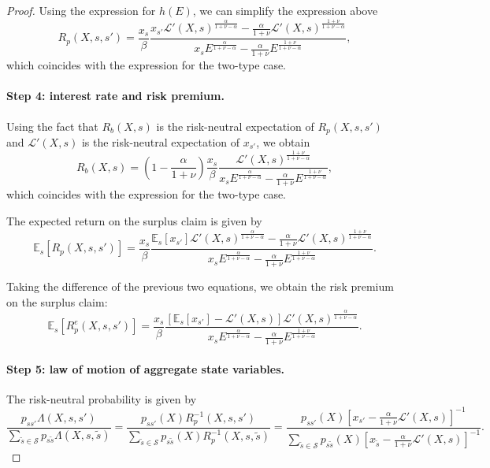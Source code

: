 \begin{proof}
Using the expression for $h(E)$, we can simplify the expression above
\begin{equation}
    R_p(X,s,s') = \frac{x_s}{\beta} \frac{x_{s'} \mathcal{L}'(X,s)^\frac{\alpha}{1+\nu-\alpha} -\frac{ \alpha}{1+\nu} \mathcal{L}'(X,s)^{\frac{1+\nu}{1+\nu-\alpha}}}{x_{s} E^\frac{\alpha}{1+\nu-\alpha} -\frac{ \alpha}{1+\nu} E^{\frac{1+\nu}{1+\nu-\alpha}}},
\end{equation}
which coincides with the expression for the two-type case. 


\paragraph{Step 4: interest rate and risk premium.} Using the fact that $R_b(X,s)$ is the risk-neutral expectation of $R_p(X,s,s')$ and $\mathcal{L}'(X,s)$ is the risk-neutral expectation of $x_{s'}$, we obtain 
\begin{equation}
    R_b(X,s) = \left(1 - \frac{\alpha}{1+\nu} \right) \frac{x_s}{\beta} \frac{  \mathcal{L}'(X,s)^{\frac{1+\nu}{1+\nu-\alpha}}}{x_{s} E^\frac{\alpha}{1+\nu-\alpha} -\frac{ \alpha}{1+\nu} E^{\frac{1+\nu}{1+\nu-\alpha}}},
\end{equation}
which coincides with the expression for the two-type case.  

The expected return on the surplus claim is given by
\begin{equation}
    \mathbb{E}_s[R_p(X,s,s')] = \frac{x_s}{\beta} \frac{\mathbb{E}_s[x_{s'}] \mathcal{L}'(X,s)^\frac{\alpha}{1+\nu-\alpha} -\frac{ \alpha}{1+\nu} \mathcal{L}'(X,s)^{\frac{1+\nu}{1+\nu-\alpha}}}{x_{s} E^\frac{\alpha}{1+\nu-\alpha} -\frac{ \alpha}{1+\nu} E^{\frac{1+\nu}{1+\nu-\alpha}}}.
\end{equation}

Taking the difference of the previous two equations, we obtain the risk premium on the surplus claim:
\begin{equation}
\mathbb{E}_s[R_p^e(X,s,s')] = \frac{x_s}{\beta} \frac{[\mathbb{E}_s[x_{s'}]-\mathcal{L}'(X,s)]\mathcal{L}'(X,s)^\frac{\alpha}{1+\nu-\alpha} }{x_{s} E^\frac{\alpha}{1+\nu-\alpha} -\frac{ \alpha}{1+\nu} E^{\frac{1+\nu}{1+\nu-\alpha}}}.
\end{equation}
\paragraph{Step 5: law of motion of aggregate state variables.}
The risk-neutral probability is given by
\begin{equation}
    \frac{p_{ss'} \Lambda(X,s,s')}{\sum_{\tilde{s}\in \mathcal{S} } p_{s\tilde{s}} \Lambda(X,s,\tilde{s})} = 
    \frac{p_{ss'}(X) R_p^{-1}(X,s,s')}{\sum_{\tilde{s}\in \mathcal{S}} p_{s\tilde{s}}(X) R_p^{-1}(X,s,\tilde{s})} = 
    \frac{p_{ss'}(X) \left[x_{s'} -\frac{ \alpha}{1+\nu} \mathcal{L}'(X,s) \right]^{-1}}{\sum_{\tilde{s}\in \mathcal{S}} p_{s\tilde{s}}(X)\left[x_{\tilde{s}} -\frac{ \alpha}{1+\nu} \mathcal{L}'(X,s) \right]^{-1}}.
\end{equation}


\end{proof}
